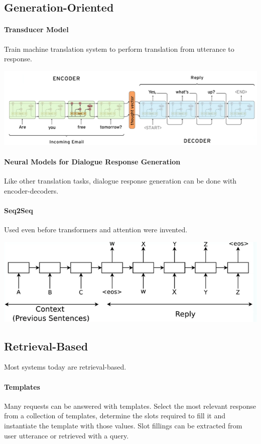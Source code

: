 \documentclass[10pt]{report}
\begin{document}
\subsection{Generation-Oriented}
\paragraph{Transducer Model} Train machine translation system to perform translation from utterance to response.
\begin{center}
	\includegraphics[scale=0.5]{121.png}
\end{center}
\paragraph{Neural Models for Dialogue Response Generation} Like other translation tasks, dialogue response generation can be done with encoder-decoders.
\paragraph{Seq2Seq} Used even before transformers and attention were invented.
\begin{center}
	\includegraphics[scale=0.5]{122.png}
\end{center}
\subsection{Retrieval-Based}
Most systems today are retrieval-based.
\paragraph{Templates} Many requests can be answered with templates. Select the most relevant response from a collection of templates, determine the slots required to fill it and instantiate the template with those values. Slot fillings can be extracted from user utterance or retrieved with a query.
\end{document}

